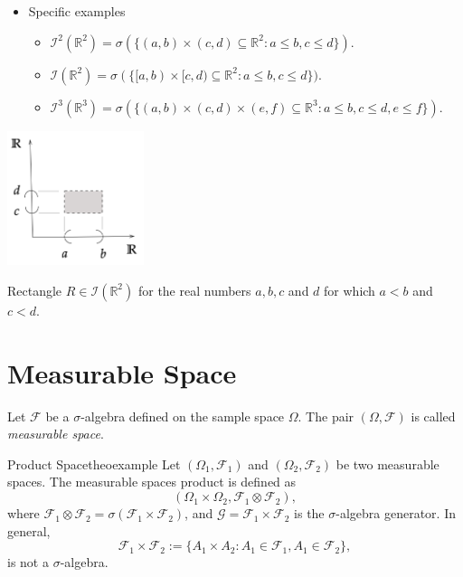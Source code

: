 \documentclass{tufte-handout}
\begin{document}
\begin{itemize}
\item  Specific examples
\begin{itemize}
 \item $\mathscr I^2(\mathbb R^2 ) = \sigma(\{(a, b) \times (c,d) \subseteq \mathbb R^2: a \leq b, c \leq d\})$.
  \item $\mathscr I(\mathbb R^2 ) = \sigma(\{[a, b) \times [c,d) \subseteq \mathbb R^2: a \leq b, c \leq d\})$.
 \item $\mathscr I^3(\mathbb R^3) = \sigma(\{(a, b) \times (c,d) \times (e,f) \subseteq \mathbb R^3: a \leq b, c \leq d, e \leq f\})$.
 \end{itemize}
\end{itemize}

\begin{marginfigure}
\centering
\includegraphics[width=4cm]{fig/rectangle.png}
\caption{Rectangle  $R \in \mathscr I(\mathbb R^2 )$ for the real numbers $a,b,c$ and $d$  for which $a < b$ and $c< d$.
}
\end{marginfigure}

\section{Measurable Space}

Let  $\mathscr F$ be a  $\sigma$-algebra defined on the sample space  $\Omega$.  The pair $(\Omega, \mathscr F)$ is called  \textit{measurable space}. 

\begin{mydef}{ Product Space}{theoexample}  
Let   $(\Omega_1, \mathscr F_1)$ and $(\Omega_2, \mathscr F_2)$ be two measurable spaces.  The  measurable spaces product is defined as
$$(\Omega_1 \times \Omega_2 , \mathscr F_1 \otimes  \mathscr F_2 ),$$ where $\mathscr F_1 \otimes  \mathscr F_2  = \sigma(\mathscr F_1 \times  \mathscr F_2)$, and $\mathcal G = \mathscr F_1 \times  \mathscr F_2$ is the $\sigma$-algebra generator. In general, $$\mathscr F_1 \times  \mathscr F_2 := \{A_1 \times A_2: A_1 \in \mathcal F_1, A_1 \in \mathcal F_2\}, $$ is not a $\sigma$-algebra.
\end{mydef}
\end{document}
